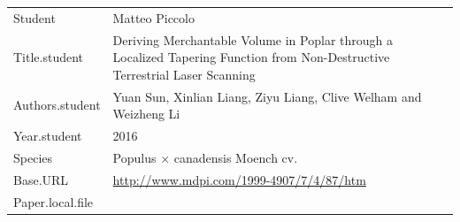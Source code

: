 \documentclass[]{article}
\begin{document}
\begin{longtable}[]{@{}ll@{}}
\toprule
\endhead
\begin{minipage}[t]{0.21\columnwidth}\raggedright
Student\strut
\end{minipage} & \begin{minipage}[t]{0.73\columnwidth}\raggedright
Matteo Piccolo\strut
\end{minipage}\tabularnewline
\begin{minipage}[t]{0.21\columnwidth}\raggedright
Title.student\strut
\end{minipage} & \begin{minipage}[t]{0.73\columnwidth}\raggedright
Deriving Merchantable Volume in Poplar through a Localized Tapering
Function from Non-Destructive Terrestrial Laser Scanning\strut
\end{minipage}\tabularnewline
\begin{minipage}[t]{0.21\columnwidth}\raggedright
Authors.student\strut
\end{minipage} & \begin{minipage}[t]{0.73\columnwidth}\raggedright
Yuan Sun, Xinlian Liang, Ziyu Liang, Clive Welham and Weizheng Li\strut
\end{minipage}\tabularnewline
\begin{minipage}[t]{0.21\columnwidth}\raggedright
Year.student\strut
\end{minipage} & \begin{minipage}[t]{0.73\columnwidth}\raggedright
2016\strut
\end{minipage}\tabularnewline
\begin{minipage}[t]{0.21\columnwidth}\raggedright
Species\strut
\end{minipage} & \begin{minipage}[t]{0.73\columnwidth}\raggedright
Populus × canadensis Moench cv.\strut
\end{minipage}\tabularnewline
\begin{minipage}[t]{0.21\columnwidth}\raggedright
Base.URL\strut
\end{minipage} & \begin{minipage}[t]{0.73\columnwidth}\raggedright
\url{http://www.mdpi.com/1999-4907/7/4/87/htm}\strut
\end{minipage}\tabularnewline
\begin{minipage}[t]{0.21\columnwidth}\raggedright
Paper.local.file\strut
\end{minipage} & \begin{minipage}[t]{0.73\columnwidth}\raggedright

\end{minipage}
\end{longtable}
\end{document}
